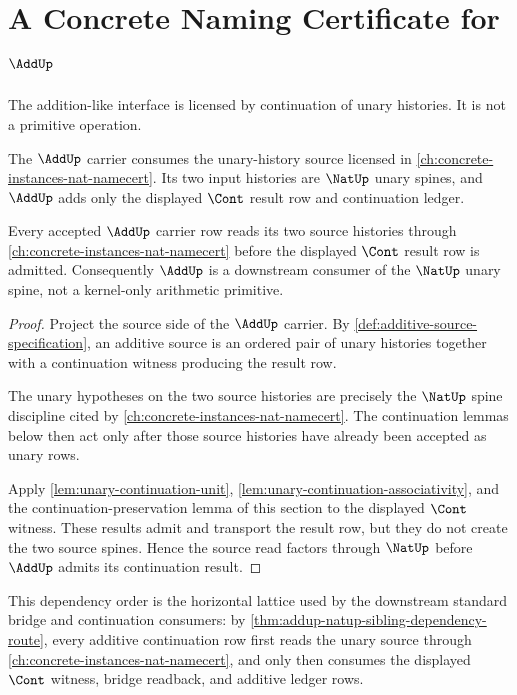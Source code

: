 \chapter{A Concrete Naming Certificate for \(\AddUp\)}
\label{ch:concrete-instances-add-namecert}

The addition-like interface is licensed by continuation of unary histories. It is not a primitive operation.

The $\AddUp$ carrier consumes the unary-history source licensed in \autoref{ch:concrete-instances-nat-namecert}. Its two input histories are $\NatUp$ unary spines, and $\AddUp$ adds only the displayed $\Cont$ result row and continuation ledger.

\begin{theorem}
\label{thm:addup-natup-sibling-dependency-route}
Every accepted $\AddUp$ carrier row reads its two source histories through \autoref{ch:concrete-instances-nat-namecert} before the displayed $\Cont$ result row is admitted. Consequently $\AddUp$ is a downstream consumer of the $\NatUp$ unary spine, not a kernel-only arithmetic primitive.
\end{theorem}
\begin{proof}
Project the source side of the $\AddUp$ carrier. By \autoref{def:additive-source-specification}, an additive source is an ordered pair of unary histories together with a continuation witness producing the result row.

The unary hypotheses on the two source histories are precisely the $\NatUp$ spine discipline cited by \autoref{ch:concrete-instances-nat-namecert}. The continuation lemmas below then act only after those source histories have already been accepted as unary rows.

Apply \autoref{lem:unary-continuation-unit}, \autoref{lem:unary-continuation-associativity}, and the continuation-preservation lemma of this section to the displayed $\Cont$ witness. These results admit and transport the result row, but they do not create the two source spines. Hence the source read factors through $\NatUp$ before $\AddUp$ admits its continuation result.
\end{proof}

This dependency order is the horizontal lattice used by the downstream standard bridge and continuation consumers: by \autoref{thm:addup-natup-sibling-dependency-route}, every additive continuation row first reads the unary source through \autoref{ch:concrete-instances-nat-namecert}, and only then consumes the displayed $\Cont$ witness, bridge readback, and additive ledger rows.

